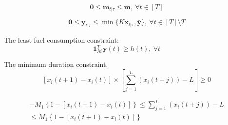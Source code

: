 \documentclass[english]{cccconf}
\begin{document}
\begin{equation}\label{eq:weight_bound_constraint}
\mathbf{0} \leq \mathbf{m}_{t|\tau} \leq \bar{\mathbf{m}}, ~\forall t \in [T]
\end{equation}

\begin{equation}\label{eq:feed_bound_constraint}
  \mathbf{0} \leq \mathbf{y}_{t|\tau} \leq \min \{K\mathbf{x}_{t|\tau},\bar{\textbf{y}}\}, ~\forall t \in [T]\setminus T
\end{equation}

The least fuel consumption constraint:
\begin{equation}\label{eq:least_fuel_consumption_constraint}
\mathbf{1}_{\mathcal{M}}^T\mathbf{y}(t)\geq h(t), ~\forall t
\end{equation}

The minimum duration constraint.
\begin{equation}\label{minimum_duration_constraint}
  [x_i(t+1) - x_i(t)]\times\left[\sum_{j=1}^L(x_i(t+j))-L\right]\geq 0
\end{equation}

\begin{equation}\label{continue constraint}
\begin{split}
    -M_1\left\{1-[x_i(t+1)-x_i(t)]\right\} \leq \sum_{j=1}^L(x_i(t+j))-L \\ \leq M_1\left\{1-[x_i(t+1)-x_i(t)]\right\}
\end{split}
\end{equation}
\end{document}
